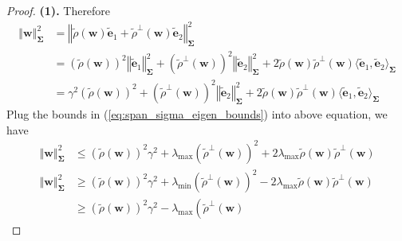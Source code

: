 \documentclass[pdflatex,sn-basic]{sn-jnl}%
\theoremstyle{thmstyleone}%
\begin{document}
\begin{appendices}
\begin{proof}
  \noindent
  \textbf{(1).}
  Therefore 
  \begin{equation*}
  \begin{aligned}
    \left\Vert \mathbf{w} \right\Vert_{\mathbf{\Sigma}}^2
    & = \left\Vert  
    \tilde{{\rho}}(\mathbf{w}) \tilde{\mathbf{e}}_1 + 
    \tilde{\rho}^{\perp} \left(\mathbf{w}\right) \tilde{\mathbf{e}}_2
    \right\Vert_{\mathbf{\Sigma}}^2
    \\ & =
    \left(
      \tilde{{\rho}}(\mathbf{w})
    \right)^2
    \left\Vert \tilde{\mathbf{e}}_1 \right\Vert_{\mathbf{\Sigma}}^2
    +
    \left(
      \tilde{\rho}^{\perp} \left(\mathbf{w}\right)
    \right)^2
    \left\Vert \tilde{\mathbf{e}}_2 \right\Vert_{\mathbf{\Sigma}}^2
    + 
    2 \tilde{\rho} \left(\mathbf{w}\right) \tilde{\rho}^{\perp} \left(\mathbf{w}\right) 
    \langle \tilde{\mathbf{e}}_1, \tilde{\mathbf{e}}_2 \rangle_{\mathbf{\Sigma}}
    \\ & =
    \gamma^{2}
    \left(
      \tilde{{\rho}}(\mathbf{w})
    \right)^2
    +
    \left(
      \tilde{\rho}^{\perp} \left(\mathbf{w}\right)
    \right)^2
    \left\Vert \tilde{\mathbf{e}}_2 \right\Vert_{\mathbf{\Sigma}}^2
    + 
    2 \tilde{\rho} \left(\mathbf{w}\right) \tilde{\rho}^{\perp} \left(\mathbf{w}\right) 
    \langle \tilde{\mathbf{e}}_1, \tilde{\mathbf{e}}_2 \rangle_{\mathbf{\Sigma}}
  \end{aligned}
  \end{equation*}
  Plug the bounds in (\ref{eq:span_sigma_eigen_bounds}) into above equation, we have 
  \begin{equation*}
  \begin{aligned}
    \left\Vert \mathbf{w} \right\Vert_{\mathbf{\Sigma}}^2 & \le 
    \left(
      \tilde{{\rho}}(\mathbf{w})
    \right)^2
    \gamma^2
    +
    \lambda_{\max}
    \left(
      \tilde{\rho}^{\perp} \left(\mathbf{w}\right)
    \right)^2
    + 
    2 \lambda_{\max} 
    \tilde{\rho} \left(\mathbf{w}\right) \tilde{\rho}^{\perp} \left(\mathbf{w}\right)
    \\ 
    \left\Vert \mathbf{w} \right\Vert_{\mathbf{\Sigma}}^2 & \ge
    \left(
      \tilde{{\rho}}(\mathbf{w})
    \right)^2
    \gamma^2
    +
    \lambda_{\min}
    \left(
      \tilde{\rho}^{\perp} \left(\mathbf{w}\right)
    \right)^2
    - 
    2 \lambda_{\max} 
    \tilde{\rho} \left(\mathbf{w}\right) \tilde{\rho}^{\perp} \left(\mathbf{w}\right)
    \\ & \ge
    \left(
      \tilde{{\rho}}(\mathbf{w})
    \right)^2
    \gamma^2
    - 
    \lambda_{\max}
    \left(
      \tilde{\rho}^{\perp} \left(\mathbf{w}\right)

\end{aligned}
\end{equation*}
\end{proof}
\end{appendices}
\end{document}
